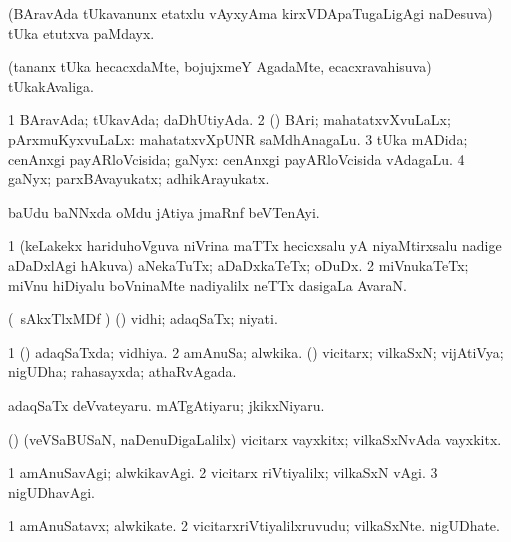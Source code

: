 {{{\bentry
{} 
\gl{\nA}
\expl{}
\bmng
(BAravAda tUkavanunx etatxlu vAyxyAma kirxVDApaTugaLigAgi naDesuva) tUka etutxva paMdayx. 
\emng
\eentry

\bentry
{} 
\gl{\nA}
\expl{}
\bmng
(tananx tUka hecacxdaMte, bojujxmeY AgadaMte, ecacxravahisuva) tUkakAvaliga. 
\emng
\eentry

\bentry
{} 
\gl{\gu}
\bmng
\bnum
\num{1} BAravAda; tUkavAda; daDhUtiyAda. 
\num{2} (\rUpa) BAri; mahatatxvXvuLaLx; pArxmuKyxvuLaLx:  mahatatxvXpUNR saMdhAnagaLu. 
\num{3} tUka mADida; cenAnxgi payARloVcisida; gaNyx:  cenAnxgi payARloVcisida vAdagaLu. 
\num{4} gaNyx; parxBAvayukatx; adhikArayukatx. 
\enum
\emng
\eentry

\bentry
{} 
\gl{\nA}
\expl{}
\bmng
baUdu baNNxda oMdu jAtiya jmaRnf beVTenAyi. 
\emng
\eentry

\bentry
{} 
\gl{\nA}
\expl{}
\bmng
\bnum
\num{1} (keLakekx hariduhoVguva niVrina maTTx hecicxsalu yA niyaMtirxsalu nadige aDaDxlAgi hAkuva) aNekaTuTx; aDaDxkaTeTx; oDuDx. 
\num{2} miVnukaTeTx; miVnu hiDiyalu boVninaMte nadiyalilx neTTx dasigaLa AvaraN. 
\enum
\emng
\eentry

\bentry
{} 
\gl{\nA}
\expl{}
\bmng
(\kanmu\ sAkxTlxMDf \parx) (\pArxparx) vidhi; adaqSaTx; niyati. 
\emng
\eentry

\bentry
{} 
\gl{\gu}
\expl{}
\bmng
\bnum
\num{1} (\pArxparx) adaqSaTxda; vidhiya. 
\num{2} amAnuSa; alwkika. (\AmA) vicitarx; vilkaSxN; vijAtiVya; nigUDha; rahasayxda; athaRvAgada. 
\enum
\emng

\noindent 
\gl{\pagu}
\expl{}
\bmng
\banum
{} adaqSaTx deVvateyaru. 
 mATgAtiyaru; jkikxNiyaru. 
\eanum
\emng
\eentry

\bentry
{} 
\gl{\nA}
\expl{}
\bmng
(\AmA) (veVSaBUSaN, naDenuDigaLalilx) vicitarx vayxkitx; vilkaSxNvAda vayxkitx. 
\emng
\eentry

\bentry
{} 
\gl{\kirxvi}
\expl{}
\bmng
\bnum
\num{1} amAnuSavAgi; alwkikavAgi. 
\num{2} vicitarx riVtiyalilx; vilkaSxN vAgi. 
\num{3} nigUDhavAgi. 
\enum
\emng
\eentry

\bentry
{} 
\gl{\nA}
\expl{}
\bmng
\bnum
\num{1} amAnuSatavx; alwkikate. 
\num{2} vicitarxriVtiyalilxruvudu; vilkaSxNte. nigUDhate. 
\enum
\emng
\eentry

}}}
